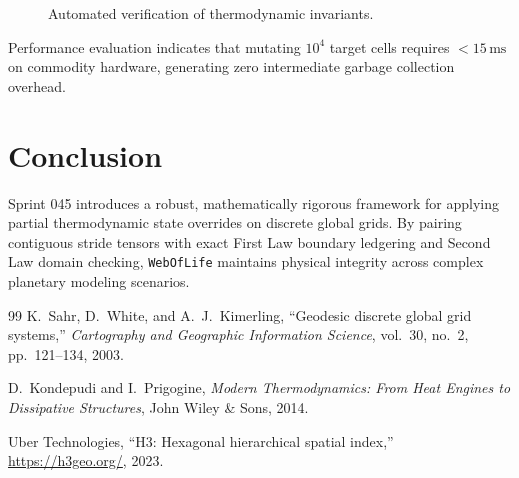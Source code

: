 \documentclass[twocolumn,10pt]{article}
\begin{document}
\begin{figure}[h]
\centering
{}
\caption{Automated verification of thermodynamic invariants.}
\label{fig:verification}
\end{figure}

Performance evaluation indicates that mutating $10^4$ target cells requires $<15\,\text{ms}$ on commodity hardware, generating zero intermediate garbage collection overhead.

\section{Conclusion}
Sprint 045 introduces a robust, mathematically rigorous framework for applying partial thermodynamic state overrides on discrete global grids. By pairing contiguous stride tensors with exact First Law boundary ledgering and Second Law domain checking, \texttt{WebOfLife} maintains physical integrity across complex planetary modeling scenarios.

\begin{thebibliography}{99}
K.~Sahr, D.~White, and A.~J.~Kimerling, ``Geodesic discrete global grid systems,'' \emph{Cartography and Geographic Information Science}, vol.~30, no.~2, pp.~121--134, 2003.

D.~Kondepudi and I.~Prigogine, \emph{Modern Thermodynamics: From Heat Engines to Dissipative Structures}, John Wiley \& Sons, 2014.

Uber Technologies, ``H3: Hexagonal hierarchical spatial index,'' \url{https://h3geo.org/}, 2023.
\end{thebibliography}
\end{document}
